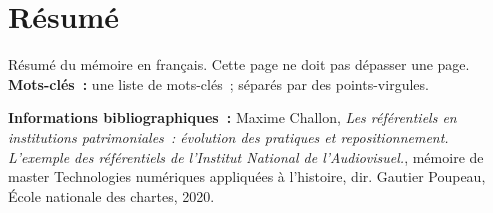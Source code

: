 	\chapter*{Résumé}
	\medskip
	Résumé du mémoire en français. Cette page ne doit pas dépasser une page.\\
	
	\textbf{Mots-clés~:} une liste de mots-clés~; séparés par des points-virgules.
	
	\textbf{Informations bibliographiques~:} Maxime Challon, \textit{Les référentiels en institutions patrimoniales : évolution des pratiques et repositionnement. L’exemple des référentiels de l’Institut National de l’Audiovisuel.}, mémoire de master \og{}Technologies numériques appliquées à l'histoire\fg{}, dir. Gautier Poupeau, École nationale des chartes, 2020.
